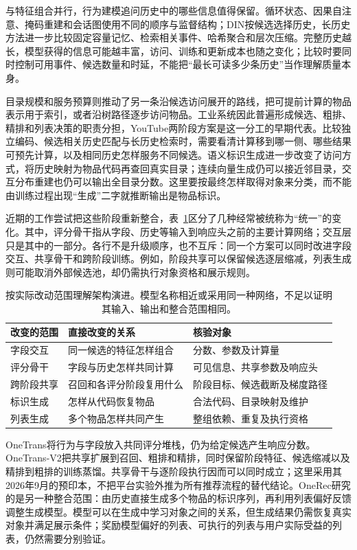 与特征组合并行，行为建模追问历史中的哪些信息值得保留。循环状态、因果自注意、掩码重建和会话图使用不同的顺序与监督结构；DIN按候选选择历史，长历史方法进一步比较固定容量记忆、检索相关事件、哈希聚合和层次压缩。完整历史越长，模型获得的信息可能越丰富，访问、训练和更新成本也随之变化；比较时要同时控制可用事件、候选数量和时延，不能把“最长可读多少条历史”当作理解质量本身。

目录规模和服务预算则推动了另一条沿候选访问展开的路线，把可提前计算的物品表示用于索引，或者沿树路径逐步访问物品。工业系统因此普遍形成候选、粗排、精排和列表决策的职责分担，YouTube两阶段方案是这一分工的早期代表。比较独立编码、候选相关历史匹配与长历史检索时，需要看清计算移到哪一侧、哪些结果可预先计算，以及相同历史怎样服务不同候选。语义标识生成进一步改变了访问方式，将历史映射为物品代码再查回真实目录；连续向量生成仍可以接近邻目录，交互分布重建也仍可以输出全目录分数。这里要按最终怎样取得对象来分类，而不能由训练过程出现“生成”二字就推断输出是物品标识。

近期的工作尝试把这些阶段重新整合，表~\ref{tab:rs-change-scope}区分了几种经常被统称为“统一”的变化。其中，评分骨干指从字段、历史等输入到响应头之前的主要计算网络；交互层只是其中的一部分。各行不是升级顺序，也不互斥：同一个方案可以同时改进字段交互、共享骨干和跨阶段训练。例如，阶段共享可以保留候选逐层缩减，列表生成则可能取消外部候选池，却仍需执行对象资格和展示规则。

\begin{table}[htbp]
  \centering
  \begin{tabularx}{\linewidth}{@{}lXX@{}}
    \toprule
    改变的范围 & 直接改变的关系 & 核验对象 \\
    \midrule
    字段交互 & 同一候选的特征怎样组合 & 分数、参数及计算量 \\
    评分骨干 & 字段与历史怎样共同计算 & 可见信息、共享参数及响应头 \\
    跨阶段共享 & 召回和各评分阶段复用什么 & 阶段目标、候选截断及梯度路径 \\
    标识生成 & 怎样从代码恢复物品 & 合法代码、目录映射及维护 \\
    列表生成 & 多个物品怎样共同产生 & 整组依赖、重复及执行资格 \\
    \bottomrule
  \end{tabularx}
  \caption{按实际改动范围理解架构演进。模型名称相近或采用同一种网络，不足以证明其输入、输出和整合范围相同。}
  \label{tab:rs-change-scope}
\end{table}

OneTrans将行为与字段放入共同评分堆栈，仍为给定候选产生响应分数。OneTrans-V2把共享扩展到召回、粗排和精排，同时保留阶段特征、候选缩减以及精排到粗排的训练蒸馏。共享骨干与逐阶段执行因而可以同时成立；这里采用其2026年9月的预印本，不把平台实验外推为所有推荐流程的替代结论。OneRec研究的是另一种整合范围：由历史直接生成多个物品的标识序列，再利用列表偏好反馈调整生成模型。模型可以在生成中学习对象之间的关系，但生成结果仍需恢复真实对象并满足展示条件；奖励模型偏好的列表、可执行的列表与用户实际受益的列表，仍然需要分别验证。

